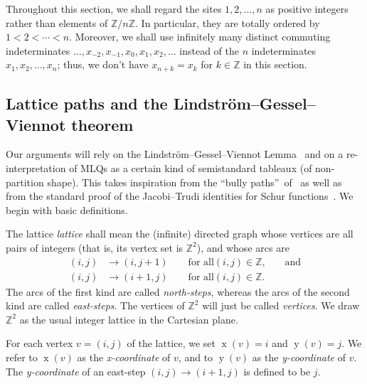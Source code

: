 \documentclass[reqno]{amsart}%
\newcommand{\0}{\phantom{c}}
\newcommand{\defn}[1]{{\color{darkred}\emph{#1}}}
\theoremstyle{plain}
\theoremstyle{definition}
\numberwithin{equation}{section}
\begin{document}
Throughout this section, we shall regard the sites $1,2,\ldots,n$ as positive
integers rather than elements of $\mathbb{Z}/n\mathbb{Z}$. In particular, they
are totally ordered by $1<2<\cdots<n$. Moreover, we shall use infinitely many
distinct commuting indeterminates $\ldots,x_{-2},x_{-1},x_{0},x_{1}%
,x_{2},\ldots$ instead of the $n$ indeterminates $x_{1},x_{2},\ldots,x_{n}$;
thus, we don't have $x_{n+k}=x_{k}$ for $k\in\mathbb{Z}$ in this section.

\subsection{Lattice paths and the Lindstr\"{o}m--Gessel--Viennot theorem}

Our arguments will rely on the Lindstr\"om--Gessel--Viennot
Lemma~\cite{GV85,Lindstrom73} and on a re-interpretation of MLQs as a certain
kind of semistandard tableaux (of non-partition shape). This takes inspiration
from the \textquotedblleft bully paths\textquotedblright\ of~\cite{AasLin17}
as well as from the standard proof of the Jacobi--Trudi identities for Schur
functions~\cite[First proof of Theorem 7.16.1]{Stanley-EC2}. We begin with
basic definitions.

The lattice \defn{lattice} shall mean the (infinite) directed graph whose
vertices are all pairs of integers (that is, its vertex set is $\mathbb{Z}%
^{2}$), and whose arcs are
\begin{align*}
\left(  i,j\right)   &  \rightarrow\left(  i,j+1\right)  \qquad\text{for all
}\left(  i,j\right)  \in\mathbb{Z}\text{,}\qquad\text{and}\\
\left(  i,j\right)   &  \rightarrow\left(  i+1,j\right)  \qquad\text{for all
}\left(  i,j\right)  \in\mathbb{Z}\text{.}%
\end{align*}
The arcs of the first kind are called \defn{north-steps}, whereas the arcs of
the second kind are called \defn{east-steps}. The vertices of $\mathbb{Z}^{2}$
will just be called \defn{vertices}. We draw $\mathbb{Z}^{2}$ as the usual
integer lattice in the Cartesian plane.

For each vertex $v=\left(  i,j\right)  $ of the lattice, we set
$\operatorname*{x}\left(  v\right)  =i$ and $\operatorname*{y}\left(
v\right)  =j$. We refer to $\operatorname*{x}\left(  v\right)  $ as the
\defn{x-coordinate} of $v$, and to $\operatorname*{y}\left(  v\right)  $ as
the \defn{y-coordinate} of $v$. The \defn{y-coordinate} of an east-step
$\left(  i,j\right)  \rightarrow\left(  i+1,j\right)  $ is defined to be $j$.
\end{document}
